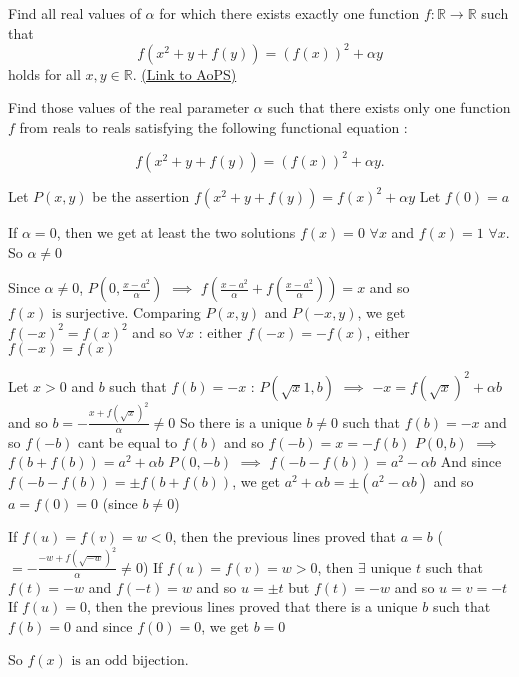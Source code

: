 \begin{problem}
	Find all real values of $\alpha$ for which there exists exactly one function $f: \mathbb R \to \mathbb R$ such that
\[ f ( x^{2} + y + f( y ) )  = (f(x))^{2} + \alpha y  \]
holds for all $x,y \in \mathbb R$.
	\flushright \href{https://artofproblemsolving.com/community/c6h416315}{(Link to AoPS)}
\end{problem}



\begin{solution}
	\begin{tcolorbox}Find those values of the real parameter $ \alpha $ such that there exists only one function $ f $ from reals to reals satisfying the following functional equation : 

\[ f ( x^{2} + y + f( y ) )  = (f(x))^{2} + \alpha y .  \]\end{tcolorbox}
Let $P(x,y)$ be the assertion $f(x^2+y+f(y))=f(x)^2+\alpha y$
Let $f(0)=a$

If $\alpha=0$, then we get at least the two solutions $f(x)=0$ $\forall x$ and $f(x)=1$ $\forall x$. So $\alpha\ne 0$

Since $\alpha\ne 0$, $P(0,\frac {x-a^2}{\alpha})$ $\implies$ $f(\frac {x-a^2}{\alpha}+f(\frac {x-a^2}{\alpha}))=x$ and so $\boxed{f(x)\text{ is surjective}}$.
Comparing $P(x,y)$ and $P(-x,y)$, we get $f(-x)^2=f(x)^2$ and so $\forall x$ : either $f(-x)=-f(x)$, either $f(-x)=f(x)$

Let $x>0$ and $b$ such that $f(b)=-x$ : $P(\sqrt x1,b)$ $\implies$ $-x=f(\sqrt x)^2+\alpha b$ and so $b=-\frac{x+f(\sqrt x)^2}{\alpha}\ne 0$
So there is a unique $b\ne 0$ such that $f(b)=-x$ and so $f(-b)$ cant be equal to $f(b)$ and so $f(-b)=x=-f(b)$
$P(0,b)$ $\implies$ $f(b+f(b))=a^2+\alpha b$
$P(0,-b)$ $\implies$ $f(-b-f(b))=a^2-\alpha b$
And since $f(-b-f(b))=\pm f(b+f(b))$, we get $a^2+\alpha b=\pm(a^2-\alpha b)$ and so $a=\boxed{f(0)=0}$ (since $b\ne 0$)

If $f(u)=f(v)=w<0$, then the previous lines proved that $a=b$ ($=-\frac{-w+f(\sqrt {-w})^2}{\alpha}\ne 0$)
If $f(u)=f(v)=w>0$, then $\exists$ unique $t$ such that $f(t)=-w$ and $f(-t)=w$ and so $u=\pm t$ but $f(t)=-w$ and so $u=v=-t$
If $f(u)=0$, then the previous lines proved that there is a unique $b$ such that $f(b)=0$ and since $f(0)=0$, we get $b=0$

So $\boxed{f(x)\text{ is an odd bijection}}$.


\end{solution}
